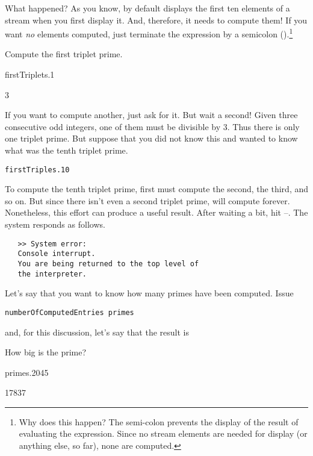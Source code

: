 {What happened?
As you know, by default
\Language{} displays the first ten
elements of a stream when you first display it.
And, therefore, it needs to compute them!
If you want {\it no} elements computed, just terminate the expression by a
semicolon (\spadSyntax{;}).\footnote{
Why does this happen? The semi-colon prevents the display of the
result of evaluating the expression.
Since no stream elements are needed for display (or anything else, so far),
none are computed.
}

\begin{xtc}
\begin{xtccomment}
Compute the first triplet prime.
\end{xtccomment}
\begin{spadsrc}
firstTriplets.1
\end{spadsrc}
\begin{TeXOutput}
\begin{fricasmath}{10}
3%
\end{fricasmath}
\end{TeXOutput}
\end{xtc}

If you want to compute another, just ask for it.
But wait a second!
Given three consecutive odd integers, one of them must be divisible
by 3. Thus there is only one triplet prime.
But suppose that you did not know this and wanted to know what was the
tenth triplet prime.
\begin{verbatim}
firstTriples.10
\end{verbatim}
To compute the tenth triplet prime, \Language{} first must compute the second,
the third, and so on.
But since there isn't even a second triplet prime, \Language{} will
compute forever.
Nonetheless, this effort can produce a useful result.
After waiting a bit, hit
--.
The system responds as follows.
\begin{verbatim}
   >> System error:
   Console interrupt.
   You are being returned to the top level of
   the interpreter.
\end{verbatim}
Let's say that you want to know how many primes have been computed.
Issue
\begin{verbatim}
numberOfComputedEntries primes
\end{verbatim}
and, for this discussion, let's say that the result is 
\begin{xtc}
\begin{xtccomment}
How big is the  prime?
\end{xtccomment}
\begin{spadsrc}
primes.2045
\end{spadsrc}
\begin{TeXOutput}
\begin{fricasmath}{11}
17837%
\end{fricasmath}
\end{TeXOutput}
\end{xtc}

}
